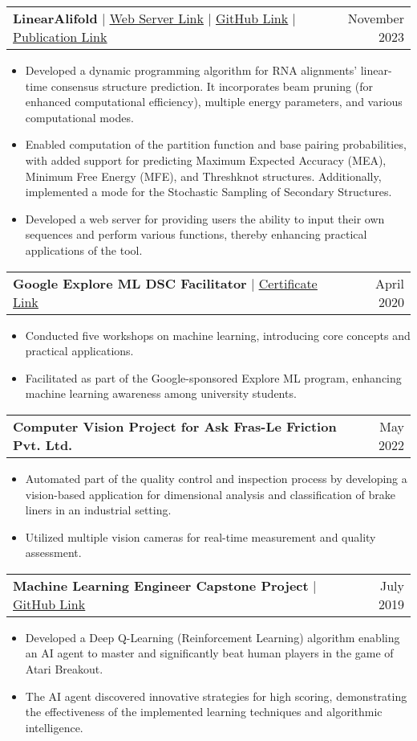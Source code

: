 \documentclass[letterpaper,11pt]{article}
\makeatletter
\newcommand{\resumeItem}[1]{
  \item\small{
    {#1 \vspace{-2pt}}
  }
}
\newcommand{\resumeProjectHeading}[2]{
    \item
    \begin{tabular*}{0.97\textwidth}{l@{\extracolsep{\fill}}r}
      \small#1 & #2 \\
    \end{tabular*}\vspace{-7pt}
}
\newcommand{\resumeItemListStart}{\begin{itemize}}
\newcommand{\resumeItemListEnd}{\end{itemize}\vspace{-5pt}}
\makeatother
\begin{document}
      \resumeProjectHeading
          {\textbf{LinearAlifold} $|$ \href{https://linearfold.eecs.oregonstate.edu/linear-alifold}{\underline{Web Server Link}} $|$ \href{https://github.com/LinearFold/LinearAlifold}
          {\underline{GitHub Link}} $|$ \href{https://www.sciencedirect.com/science/article/pii/S0022283624002961}{\underline{Publication Link}}} {November 2023}
          \resumeItemListStart
            \resumeItem{ Developed a dynamic programming algorithm for RNA alignments' linear-time consensus structure prediction. It incorporates beam pruning (for enhanced computational efficiency), multiple energy parameters, and various computational modes.}
            \resumeItem{Enabled computation of the partition function and base pairing probabilities, with added support for predicting Maximum Expected Accuracy (MEA), Minimum Free Energy (MFE), and Threshknot structures. Additionally, implemented a mode for the Stochastic Sampling of Secondary Structures.}
            \resumeItem{Developed a web server for providing users the ability to input their own sequences and perform various functions, thereby enhancing practical applications of the tool. }
          \resumeItemListEnd
          
      \resumeProjectHeading
          {\textbf{Google Explore ML DSC Facilitator} $|$ \href{https://drive.google.com/file/d/15abBtBUW1hRcmjXRya3rsrgSMyHbqR-4/view}{\underline{Certificate Link}}}{April 2020}
          \resumeItemListStart
            \resumeItem{Conducted five workshops on machine learning, introducing core concepts and practical applications.}
            \resumeItem{Facilitated as part of the Google-sponsored Explore ML program, enhancing machine learning awareness among university students.}
          \resumeItemListEnd

      \resumeProjectHeading
          {\textbf{Computer Vision Project for Ask Fras-Le Friction Pvt. Ltd.}}{May 2022}
          \resumeItemListStart
            \resumeItem{Automated part of the quality control and inspection process by developing a vision-based application for dimensional analysis and classification of brake liners in an industrial setting.}
            \resumeItem{Utilized multiple vision cameras for real-time measurement and quality assessment.}
          \resumeItemListEnd

      \resumeProjectHeading
          {\textbf{Machine Learning Engineer Capstone Project} $|$ \href{https://github.com/1998apoorvmalik/machine-learning-engineer-capstone}{\underline{GitHub Link}}}{July 2019}
          \resumeItemListStart
            \resumeItem{Developed a Deep Q-Learning (Reinforcement Learning) algorithm enabling an AI agent to master and significantly beat human players in the game of Atari Breakout.}
            \resumeItem{The AI agent discovered innovative strategies for high scoring, demonstrating the effectiveness of the implemented learning techniques and algorithmic intelligence.}
          \resumeItemListEnd
\end{document}
